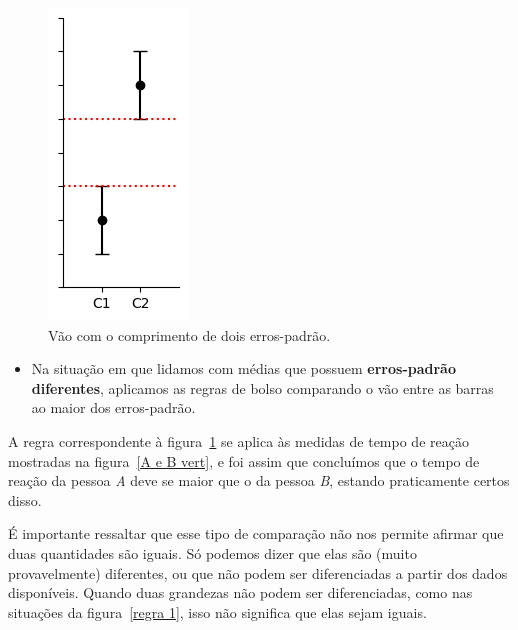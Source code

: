 \documentclass[12pt, a4paper]{article}
\begin{document}
\begin{figure}[H]
    \centering
    \includegraphics[width=0.23\linewidth]{regra 2.2.png}
    \caption{Vão com o comprimento de dois erros-padrão.}
    \label{regra 2}
\end{figure}

\smallskip

\begin{itemize}
    \item Na situação em que lidamos com médias que possuem \textbf{erros-padrão diferentes}, aplicamos as regras de bolso comparando o vão entre as barras ao maior dos erros-padrão.
\end{itemize}

A regra correspondente à figura~\ref{regra 2} se aplica às medidas de tempo de reação mostradas na figura~\ref{A e B vert}, e foi assim que concluímos que o tempo de reação da pessoa \textit{A} deve se maior que o da pessoa \textit{B}, estando praticamente certos disso.

É importante ressaltar que esse tipo de comparação não nos permite afirmar que duas quantidades são iguais. Só podemos dizer que elas são (muito provavelmente) diferentes, ou que não podem ser diferenciadas a partir dos dados disponíveis. Quando duas grandezas não podem ser diferenciadas, como nas situações da figura~\ref{regra 1}, isso não significa que elas sejam iguais.
\end{document}
